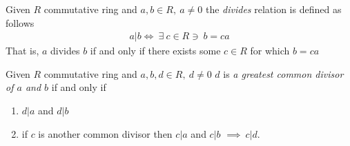 \begin{definition}
    Given $R$ commutative ring and $a,b\in R, \ a\neq 0$ the \textit{divides} relation is defined as
    follows
    \begin{align}
        a |b \iff \ \exists \ c\in R \ni \ b=ca \nonumber
    \end{align}
    That is, $a$ divides $b$ if and only if there exists some $c\in R$ for which $b=ca$
\end{definition}
\newpage
\begin{definition}
     Given $R$ commutative ring and $a,b, d \in R, \ d\neq 0$ $d$ is \textit{a greatest common
     divisor of $a$ and $b$} if and only if
     \begin{enumerate}
        \item $d|a$ and $d|b$
        \item if $c$ is another common divisor then $c|a$ and $c|b$ $\implies \ c|d$.
     \end{enumerate}
\end{definition}

